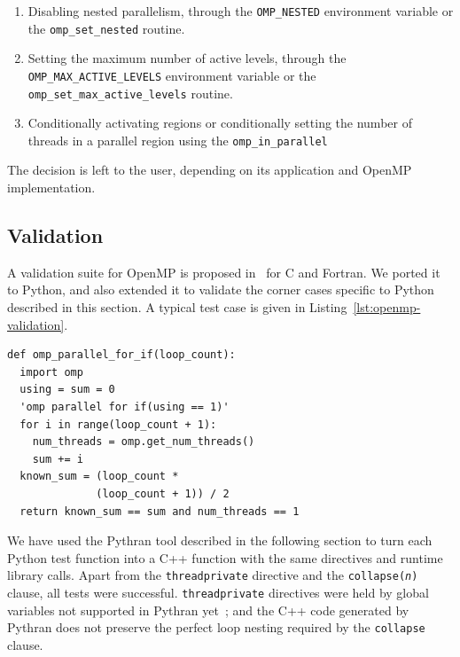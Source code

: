 \documentclass[conference]{IEEEtran}
\begin{document}
\begin{enumerate}

    \item Disabling nested parallelism, through the \texttt{OMP\_NESTED}
        environment variable or the \texttt{omp\_set\_nested} routine.

    \item Setting the maximum number of active levels, through the
        \texttt{OMP\_MAX\_ACTIVE\_LEVELS} environment variable or the
        \texttt{omp\_set\_max\_active\_levels} routine.


    \item Conditionally activating regions or conditionally setting the number
        of threads in a parallel region using the \texttt{omp\_in\_parallel}

\end{enumerate}

The decision is left to the user, depending on its application and OpenMP
implementation.

\subsection{Validation}

A validation suite for OpenMP is proposed in~\cite{wang2012} for C and Fortran.
We ported it to Python, and also extended it to validate the corner cases
specific to Python described in this section. A typical test case is given in
Listing~\ref{lst:openmp-validation}.

\begin{lstlisting}[float,label={lst:openmp-validation},caption={Example of
  Python OpenMP validation test case.}]
def omp_parallel_for_if(loop_count):
  import omp
  using = sum = 0
  'omp parallel for if(using == 1)'
  for i in range(loop_count + 1):
    num_threads = omp.get_num_threads()
    sum += i
  known_sum = (loop_count *
              (loop_count + 1)) / 2
  return known_sum == sum and num_threads == 1
\end{lstlisting}

We have used the Pythran tool described in the following %
 section to turn each
Python test function into a C++ function with the same directives and runtime
library calls. Apart from the \texttt{threadprivate} directive and the
\texttt{collapse(\emph{n})} clause, all tests were successful.
\texttt{threadprivate} directives were held by global variables not supported in
Pythran yet~; and the C++ code generated by Pythran does not preserve the
perfect loop nesting required by the \texttt{collapse} clause.
\end{document}
